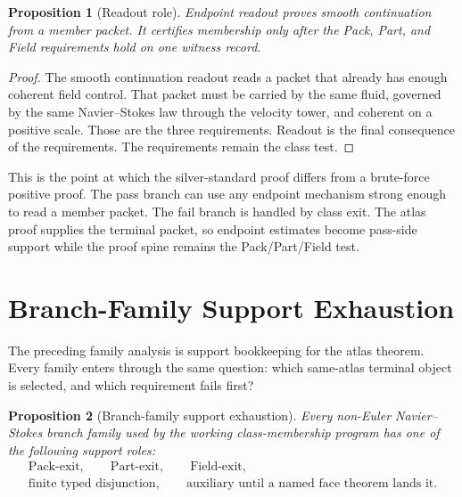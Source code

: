 \documentclass[11pt]{article}
\newtheorem{proposition}{Proposition}
\newcommand{\Pack}{\mathrm{Pack}}
\newcommand{\Part}{\mathrm{Part}}
\newcommand{\Field}{\mathrm{Field}}
\begin{document}
\begin{proposition}[Readout role]
Endpoint readout proves smooth continuation from a member packet.
It certifies membership only after the Pack, Part, and Field requirements hold on one witness record.
\end{proposition}

\begin{proof}
The smooth continuation readout reads a packet that already has enough coherent field control.
That packet must be carried by the same fluid, governed by the same Navier--Stokes law through the velocity tower, and coherent on a positive scale.
Those are the three requirements.
Readout is the final consequence of the requirements.
The requirements remain the class test.
\end{proof}

This is the point at which the silver-standard proof differs from a brute-force positive proof.
The pass branch can use any endpoint mechanism strong enough to read a member packet.
The fail branch is handled by class exit.
The atlas proof supplies the terminal packet, so endpoint estimates become pass-side support while the proof spine remains the Pack/Part/Field test.

\section{Branch-Family Support Exhaustion}

The preceding family analysis is support bookkeeping for the atlas theorem.
Every family enters through the same question: which same-atlas terminal object is selected, and which requirement fails first?

\begin{proposition}[Branch-family support exhaustion]
Every non-Euler Navier--Stokes branch family used by the working class-membership program has one of the following support roles:
\[
  \begin{gathered}
  \Pack\text{-exit},\qquad
  \Part\text{-exit},\qquad
  \Field\text{-exit},\\
  \text{finite typed disjunction},\qquad
  \text{auxiliary until a named face theorem lands it}.
  \end{gathered}
\]
\end{proposition}
\end{document}

